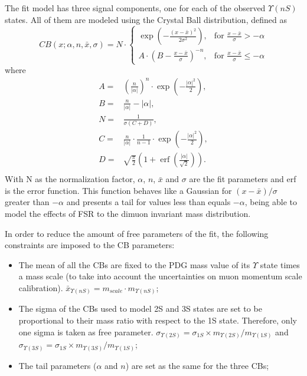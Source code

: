 The fit model has three signal components, one for each of the observed $\Upsilon(nS)$ states. All of them are modeled using the Crystal Ball distribution, defined as
\begin{equation}
  CB(x;\alpha,n,\bar x,\sigma) = N \cdot 
  \begin{cases} 
    \exp(- \frac{(x - \bar x)^2}{2 \sigma^2}), & \mbox{for }\frac{x - \bar x}{\sigma} > -\alpha \\
    A \cdot (B - \frac{x - \bar x}{\sigma})^{-n}, & \mbox{for }\frac{x - \bar x}{\sigma} \leqslant -\alpha 
  \end{cases}
\end{equation}
where
\begin{equation}
\begin{split}
  A = & \left(\frac{n}{\left| \alpha \right|}\right)^n \cdot \exp\left(- \frac {\left| \alpha \right|^2}{2}\right), \\
  B = & \frac{n}{\left| \alpha \right|}  - \left| \alpha \right|, \\
  N = & \frac{1}{\sigma (C + D)}, \\
  C = & \frac{n}{\left| \alpha \right|} \cdot \frac{1}{n-1} \cdot \exp\left(- \frac {\left| \alpha \right|^2}{2}\right), \\
  D = & \sqrt{\frac{\pi}{2}} \left(1 + \operatorname{erf}\left(\frac{\left| \alpha \right|}{\sqrt 2}\right)\right). \\
\end{split}
\end{equation}
With N as the normalization factor, $\alpha$, $n$, $\bar x$ and $\sigma$ are the fit parameters and erf is the error function. This function behaves like a Gaussian for $(x-\bar x)/\sigma$ greater than $-\alpha$ and presents a tail for values less than equals $-\alpha$, being able to model the effects of FSR to the dimuon invariant mass distribution.

In order to reduce the amount of free parameters of the fit, the following constraints are imposed to the CB parameters:
\begin{itemize}
  \item The mean of all the CBs are fixed to the PDG mass value of its $\Upsilon$ state times a mass scale (to take into account the uncertainties on muon momentum scale calibration). $\bar x_{\Upsilon(nS)} = m_{scale}\cdot m_{\Upsilon(nS)}$;
  \item The sigma of the CBs used to model 2S and 3S states are set to be proportional to their mass ratio with respect to the 1S state. Therefore, only one sigma is taken as free parameter. $\sigma_{\Upsilon(2S)} = \sigma_{1S}\times m_{\Upsilon(2S)}/m_{\Upsilon(1S)}$ and $\sigma_{\Upsilon(3S)} = \sigma_{1S}\times m_{\Upsilon(3S)}/m_{\Upsilon(1S)}$;
  \item The tail parameters ($\alpha$ and $n$) are set as the same for the three CBs;
\end{itemize}

